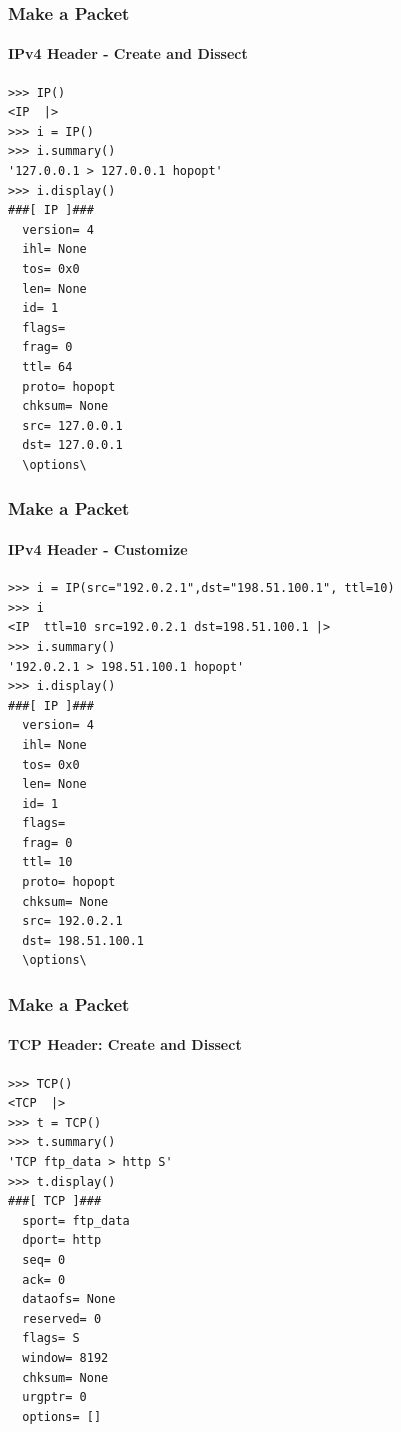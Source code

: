 \documentclass{beamer}
\begin{document}
\begin{frame}[fragile]
\frametitle{Make a Packet}
\framesubtitle{IPv4 Header - Create and Dissect}
\begin{lstlisting}[caption={Creating and Dissecting an IPv4 Header}]
>>> IP()
<IP  |>
>>> i = IP()
>>> i.summary()
'127.0.0.1 > 127.0.0.1 hopopt'
>>> i.display()
###[ IP ]### 
  version= 4
  ihl= None
  tos= 0x0
  len= None
  id= 1
  flags= 
  frag= 0
  ttl= 64
  proto= hopopt
  chksum= None
  src= 127.0.0.1
  dst= 127.0.0.1
  \options\
\end{lstlisting}
\end{frame}

\begin{frame}[fragile]
\frametitle{Make a Packet}
\framesubtitle{IPv4 Header - Customize}
\begin{lstlisting}[caption={Customizing an IPv4 Header\footnote{These IP addresses have been reserved for use in documentation and examples, and should not be used publicly\cite{rfc5737}.}}]
>>> i = IP(src="192.0.2.1",dst="198.51.100.1", ttl=10)
>>> i
<IP  ttl=10 src=192.0.2.1 dst=198.51.100.1 |>
>>> i.summary()
'192.0.2.1 > 198.51.100.1 hopopt'
>>> i.display()
###[ IP ]### 
  version= 4
  ihl= None
  tos= 0x0
  len= None
  id= 1
  flags= 
  frag= 0
  ttl= 10
  proto= hopopt
  chksum= None
  src= 192.0.2.1
  dst= 198.51.100.1
  \options\
\end{lstlisting}
\end{frame}


\begin{frame}[fragile]
\frametitle{Make a Packet}
\framesubtitle{TCP Header: Create and Dissect}
\begin{lstlisting}[caption={Creating and Dissecting a TCP Header}]
>>> TCP()
<TCP  |>
>>> t = TCP()
>>> t.summary()
'TCP ftp_data > http S'
>>> t.display()
###[ TCP ]### 
  sport= ftp_data
  dport= http
  seq= 0
  ack= 0
  dataofs= None
  reserved= 0
  flags= S
  window= 8192
  chksum= None
  urgptr= 0
  options= []

\end{lstlisting}
\end{frame}
\end{document}
